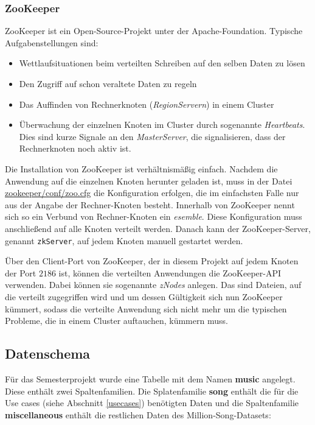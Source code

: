 \subsubsection{ZooKeeper}\label{zook}
ZooKeeper ist ein Open-Source-Projekt unter der Apache-Foundation. Typische Aufgabenstellungen sind:
\begin{itemize}
\item Wettlaufsituationen beim verteilten Schreiben auf den selben Daten zu lösen
\item Den Zugriff auf schon veraltete Daten zu regeln 
\item Das Auffinden von Rechnerknoten (\textit{RegionServern}) in einem Cluster
\item Überwachung der einzelnen Knoten im Cluster durch sogenannte \textit{Heartbeats}. Dies sind kurze Signale an den  \textit{MasterServer}, die signalisieren, dass der Rechnerknoten noch aktiv ist. 
\end{itemize}

Die Installation von ZooKeeper ist verhältnismäßig einfach. Nachdem die Anwendung auf die einzelnen Knoten herunter geladen ist, muss in der Datei \url{zookeeper/conf/zoo.cfg}
die Konfiguration erfolgen, die im einfachsten Falle nur aus der Angabe der Rechner-Knoten besteht. Innerhalb von ZooKeeper nennt sich so ein Verbund
von Rechner-Knoten ein \textit{esemble}. Diese Konfiguration muss anschließend auf alle Knoten verteilt werden. Danach kann der ZooKeeper-Server, genannt \texttt{zkServer},
auf jedem Knoten manuell gestartet werden. 

Über den Client-Port von ZooKeeper, der in diesem Projekt auf jedem Knoten der Port $2186$ ist, können die verteilten
Anwendungen die ZooKeeper-API verwenden. Dabei können sie sogenannte \textit{zNodes} anlegen. Das sind Dateien, auf die verteilt zugegriffen wird und um dessen
Gültigkeit sich nun ZooKeeper kümmert, sodass die verteilte Anwendung sich nicht mehr um die typischen Probleme, die in einem Cluster auftauchen, kümmern muss.


\subsection{Datenschema}\label{hbase_datenschema}
Für das Semesterprojekt wurde eine Tabelle mit dem Namen \textbf{music} angelegt. Diese enthält zwei Spaltenfamilien. Die Splatenfamilie \textbf{song} enthält die für die Use cases (siehe Abschnitt \ref{usecases}) benötigten Daten und die Spaltenfamilie
\textbf{miscellaneous} enthält die restlichen Daten des Million-Song-Datasets:

